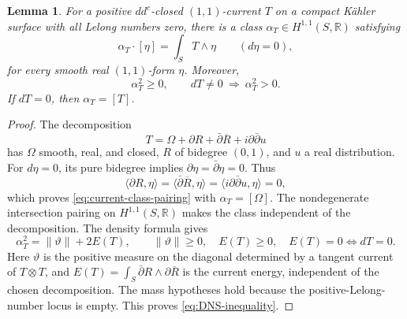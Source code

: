 \documentclass[11pt]{amsart}
\newtheorem{lemma}[theorem]{Lemma}
\theoremstyle{definition}
\theoremstyle{remark}
\numberwithin{equation}{section}
\newcommand{\R}{\mathbb R}
\begin{document}
\begin{lemma}\label{lem:surface-current-inequality}
For a positive $dd^c$-closed $(1,1)$-current $T$ on a compact
K\"ahler surface with all Lelong numbers zero, there is a class
$\alpha_T\in H^{1,1}(S,\R)$ satisfying
\begin{equation}\label{eq:current-class-pairing}
 \alpha_T\cdot[\eta]=\int_S T\wedge\eta
 \qquad(d\eta=0),
\end{equation}
for every smooth real $(1,1)$-form $\eta$. Moreover,
\begin{equation}\label{eq:DNS-inequality}
 \alpha_T^2\ge0,\qquad dT\ne0\ \Longrightarrow\ \alpha_T^2>0.
\end{equation}
If $dT=0$, then $\alpha_T=[T]$.
\end{lemma}
\begin{proof}
The decomposition \cite[\S2.1 and Lemma~B.2]{DNS22}
\[
 T=\Omega+\partial R+\bar\partial\overline R
                  +i\partial\bar\partial u
\]
has $\Omega$ smooth, real, and closed, $R$ of bidegree $(0,1)$,
and $u$ a real distribution. For $d\eta=0$, its pure bidegree
implies $\partial\eta=\bar\partial\eta=0$. Thus
\[
 \langle\partial R,\eta\rangle
 =\langle\bar\partial\overline R,\eta\rangle
 =\langle i\partial\bar\partial u,\eta\rangle=0,
\]
which proves \eqref{eq:current-class-pairing} with
$\alpha_T=[\Omega]$. The nondegenerate intersection pairing on
$H^{1,1}(S,\R)$ makes the class independent of the decomposition.
The density formula \cite[Theorem~2.2(2), Corollary~2.4]{DNS22} gives
\[
 \alpha_T^2=\|\vartheta\|+2E(T),\qquad
 \|\vartheta\|\ge0,\quad E(T)\ge0,
 \quad E(T)=0\Longleftrightarrow dT=0.
\]
Here $\vartheta$ is the positive measure on the diagonal determined
by a tangent current of $T\otimes T$, and
$E(T)=\int_S\bar\partial R\wedge\partial\overline R$ is the
current energy, independent of the chosen decomposition.
The mass hypotheses hold because the positive-Lelong-number locus
is empty. This proves
\eqref{eq:DNS-inequality}.
\end{proof}
\end{document}
